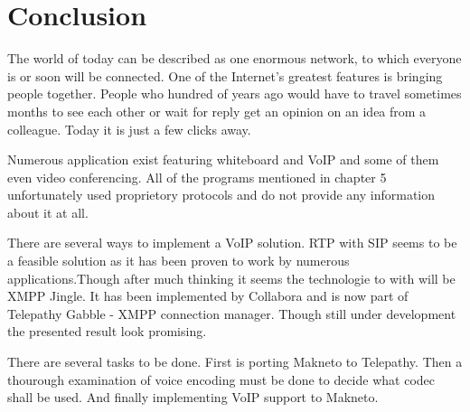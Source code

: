 

\chapter{Conclusion}
The world of today can be described as one enormous network, to which everyone is or soon will be connected. One of the Internet's greatest features is bringing people together. People who hundred of years ago would have to travel sometimes months to see each other or wait for reply get an opinion on an idea from a colleague. Today it is just a few clicks away.

Numerous application exist featuring whiteboard and VoIP and some of them even video conferencing. All of the programs mentioned in chapter 5 unfortunately used proprietory protocols and do not provide any information about it at all. 

There are several ways to implement a VoIP solution. RTP with SIP seems to be a feasible solution as it has been proven to work by numerous applications.Though after much thinking it seems the technologie to with will be XMPP Jingle. It has been implemented by Collabora and is now part of Telepathy Gabble - XMPP connection manager. Though still under development the presented result look promising.

There are several tasks to be done. First is porting Makneto to Telepathy. Then a thourough examination of voice encoding must be done to decide what codec shall be used. And finally implementing VoIP support to Makneto.   



